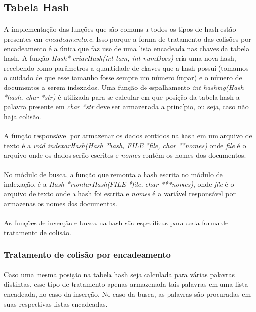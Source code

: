 \documentclass[12pt,a4paper]{article}
\begin{document}
  \subsection{Tabela Hash}
  {\paragraph{} A implementação das funções que são comuns a todos os tipos de hash estão presentes em \emph{encadeamento.c}.
  Isso porque a forma de tratamento das colisões por encadeamento é a única que faz uso de uma lista encadeada nas chaves da tabela hash.
  A função \emph{Hash* criarHash(int tam, int numDocs)} cria uma nova hash, recebendo como parâmetros a quantidade de chaves que a 
  hash possui (tomamos o cuidado de que esse tamanho fosse sempre um número ímpar) e o número de documentos a serem indexados.
  Uma função de espalhamento \emph{int hashing(Hash *hash, char *str)} é utilizada para se calcular em que posição da tabela hash
  a palavra presente em \emph{char *str} deve ser armazenada a princípio, ou seja, caso não haja colisão. }
  {\paragraph{} A função responsável por armazenar os dados contidos na hash em um arquivo de texto é a \emph{void indexarHash(Hash *hash, FILE *file, char **nomes)} 
  onde \emph{file} é o arquivo onde os dados serão escritos e \emph{nomes} contém os nomes dos documentos. }
  {\paragraph{} No módulo de busca, a função que remonta a hash escrita no módulo de indexação, é a \emph{Hash *montarHash(FILE *file, char ***nomes)}, 
  onde \emph{file} é o arquivo de texto onde a hash foi escrita e \emph{nomes} é a variável responsável por armazenas os nomes dos documentos. }
  {\paragraph{} As funções de inserção e busca na hash são específicas para cada forma de tratamento de colisão.}
  
   
   \subsubsection{Tratamento de colisão por encadeamento}
    {\paragraph{} Caso uma mesma posição na tabela hash seja calculada para várias palavras distintas, esse tipo de tratamento apenas armazenada
    tais palavras em uma lista encadeada, no caso da inserção. No caso da busca, as palavras são procuradas em suas respectivas listas encadeadas.}
   
\end{document}

